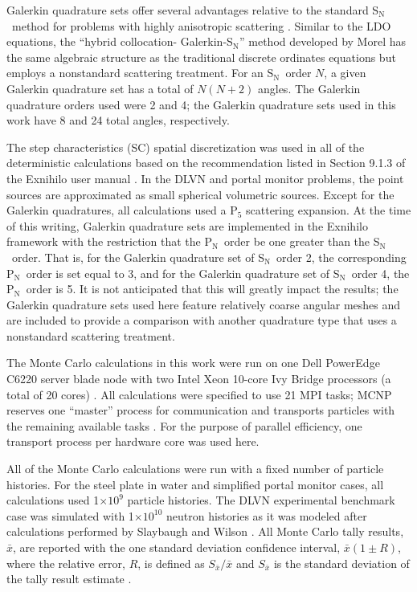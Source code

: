 \documentclass{article} %
\newcommand{\sn}{S$_\mathrm{N}$}
\newcommand{\pn}{P$_\mathrm{N}$}
\newcommand{\xbar}{\ensuremath{\bar{x}}}
\newcommand{\E}[1]{$\times10^{#1}$}
\begin{document}
Galerkin quadrature sets offer several advantages relative to the standard
\sn\ method for problems with highly anisotropic scattering \cite{morel}.
Similar to the LDO equations, the 
``hybrid collocation- Galerkin-S$_\mathrm{N}$'' method developed by Morel 
has the same algebraic structure as the traditional discrete ordinates
equations but employs a nonstandard scattering treatment. For an \sn\ order
$N$, a given Galerkin quadrature set has a total of $N(N+2)$ angles. The
Galerkin quadrature orders used were 2 and 4; the
Galerkin quadrature sets used in this work have 8 and 24 total angles,
respectively.

The step characteristics (SC) spatial discretization was used in all of the
deterministic calculations based on the recommendation listed in Section 9.1.3
of the Exnihilo user manual \cite{exum}. In the DLVN and portal monitor
problems, the point sources are approximated as small spherical volumetric
sources. Except for the Galerkin quadratures, all calculations used a P$_5$
scattering expansion. At the time of this writing, Galerkin quadrature sets
are implemented in the Exnihilo framework with the restriction that the \pn\
order be one greater than the \sn\ order. That is, for the Galerkin quadrature
set of \sn\ order 2, the corresponding \pn\ order is set equal to 3, and for
the Galerkin quadrature set of \sn\ order 4, the \pn\ order is 5. It is not
anticipated that this will greatly impact the results; the Galerkin
quadrature sets used here feature relatively coarse angular meshes and are
included to provide a comparison with another quadrature type that uses a
nonstandard scattering treatment.

The Monte Carlo calculations in this work were run on one Dell PowerEdge C6220
server blade node with two Intel Xeon 10-core Ivy Bridge processors (a total
of 20 cores) \cite{savio}. All calculations were specified to use 21 MPI
tasks; MCNP reserves one ``master'' process for communication and transports
particles with the remaining available tasks \cite{mcnp}. For the purpose of
parallel efficiency, one transport process per hardware core was used here.

All of the Monte Carlo calculations were run with a fixed number of particle
histories. For the steel plate in water and simplified portal
monitor cases, all calculations used 1\E{9} particle histories. The DLVN
experimental benchmark case was simulated with 1\E{10} neutron histories as it
was modeled after calculations performed by Slaybaugh and Wilson
\cite{sw-dlvn}. All Monte Carlo tally results, $\xbar$, are reported with the
one standard deviation confidence interval, $\xbar(1\pm R)$, where the relative
error, $R$, is defined as $S_{\xbar}/\xbar$ and $S_{\xbar}$ is the standard
deviation of the tally result estimate \cite{mcnp}.
\end{document}
